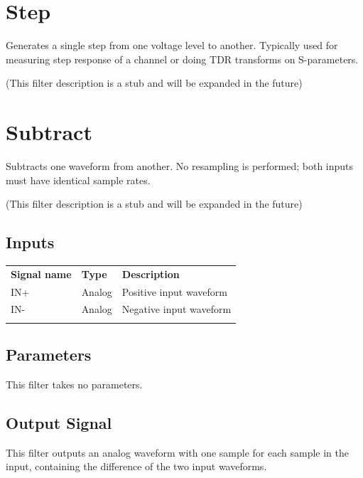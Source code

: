 \section{Step}

Generates a single step from one voltage level to another. Typically used for measuring step response of a channel or
doing TDR transforms on S-parameters.

(This filter description is a stub and will be expanded in the future)

\pagebreak
\section{Subtract}

Subtracts one waveform from another. No resampling is performed; both inputs must have identical sample rates.

(This filter description is a stub and will be expanded in the future)

\subsection{Inputs}

\begin{tabularx}{16cm}{llX}
\thickhline
\textbf{Signal name} & \textbf{Type} & \textbf{Description} \\
\thickhline
IN+ & Analog & Positive input waveform \\
\thinhline
IN- & Analog & Negative input waveform \\
\thickhline
\end{tabularx}

\subsection{Parameters}

This filter takes no parameters.

\subsection{Output Signal}

This filter outputs an analog waveform with one sample for each sample in the input, containing the difference of the
two input waveforms.

\pagebreak
